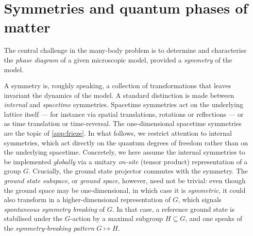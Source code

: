 \section{Symmetries and quantum phases of matter}\label{eq:SymGappedPhases}
The central challenge in the many-body problem is to determine and characterise the \emph{phase diagram} of a given microscopic model, provided a \emph{symmetry} of the model. 

A symmetry is, roughly speaking, a collection of transformations that leaves invariant the dynamics of the model. A standard distinction is made between \emph{internal} and \emph{spacetime} symmetries. Spacetime symmetries act on the underlying lattice itself --- for instance via spatial translations, rotations or reflections --- or as time translation or time-reversal. The one-dimensional spacetime symmetries are the topic of \cref{app:frieze}. In what follows, we restrict attention to internal symmetries, which act directly on the quantum degrees of freedom rather than on the underlying spacetime. Concretely, we here assume the internal symmetries to be implemented \emph{globally} via a unitary \emph{on-site} (tensor product) representation of a group $G$. Crucially, the ground state projector commutes with the symmetry. The \emph{ground state subspace}, or \emph{ground space}, however, need not be trivial: even though the ground space may be one-dimensional, in which case it is \emph{symmetric}, it could also transform in a higher-dimensional representation of $G$, which signals \emph{spontaneous symmetry breaking} of $G$. In that case, a reference ground state is stabilised under the $G$-action by a maximal subgroup $H\subseteq G$, and one speaks of the \emph{symmetry-breaking pattern} $G\mapsto H$.

